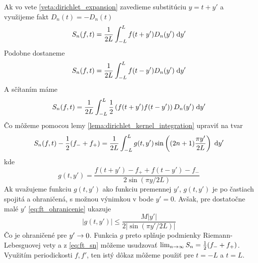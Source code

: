 \begin{dokaz}
    Ak vo vete \ref{veta:dirichlet_expansion} zavedieme substitúciu
    $y=t+y'$ a využijeme fakt $D_n(t)=-D_n(t)$
    \begin{equation}
        S_n(f,t) = \frac{1}{2L} \int_{-L}^{L} f(t+y') D_n(y') \; \mathrm{d} y'
    \end{equation}
    Podobne dostaneme
    \begin{equation}
        S_n(f,t) = \frac{1}{2L} \int_{-L}^{L} f(t-y') D_n(y') \; \mathrm{d} y'
    \end{equation}
    A sčítaním máme
    \begin{equation}
        S_n(f,t) = \frac{1}{2L} \int_{-L}^{L} \frac{1}{2} 
            \left( f(t+y') f(t-y') \right) D_n(y') \; \mathrm{d} y'
    \end{equation}
    Čo môžeme pomocou lemy \ref{lema:dirichlet_kernel_integration}
    upraviť na tvar
    \begin{equation}
    S_n(f,t) - \frac{1}{2}(f_-+f_+)= \frac{1}{2L} \int_{-L}^{L} 
        g(t,y') \sin\left( (2n+1)\frac{\pi y'}{2L} \right)\; \mathrm{d} y'
        \label{eq:ft_sn}
    \end{equation}
    kde
    \begin{equation}
        g(t,y') = \frac{f(t+y')-f_+ + f(t-y')-f_-}{2 \sin(\pi y/ 2L)}
    \end{equation}
    Ak uvažujeme funkciu $g(t,y')$ ako funkciu premennej $y'$,
    $g(t,y')$ je po častiach spojitá a ohraničená, s možnou výnimkou
    v bode $y'=0$. Avšak, pre dostatočne malé $y'$ \ref{eq:ft_ohranicenie}
    ukazuje
    \begin{equation}
        |g(t,y')|\le \frac{M |y'|}{2|\sin(\pi y'/2L)|}
    \end{equation}
    Čo je ohraničené pre $y'\rightarrow 0$.
    Funkcia $g$ preto splňuje podmienky Riemann-Lebesguovej vety
    a z \ref{eq:ft_sn} môžeme usudzovať
    $\lim_{n\rightarrow\infty} S_n = \frac{1}{2}(f_- + f_+)$.
    Využitím periodickosti $f,f'$, ten istý dôkaz môžeme použiť pre
    $t=-L$ a $t=L$.
\end{dokaz}

